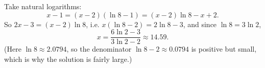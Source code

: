 Take natural logarithms:
\[x-1=(x-2)(\ln8-1)=(x-2)\ln8-x+2 .\]
So $2x-3=(x-2)\ln 8$, i.e. $x(\ln8-2)=2\ln8-3$, and since $\ln8=3\ln2$,
\[x=\boxed{\dfrac{6\ln2-3}{3\ln2-2}}\approx14.59 .\]
(Here $\ln8\approx2.0794$, so the denominator $\ln8-2\approx0.0794$ is positive but small, which is why the solution is fairly large.)
